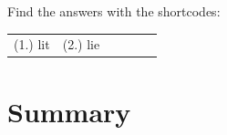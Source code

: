 \label{m39392*eip-770}
\par {} Find the answers with the shortcodes:
\par \begin{tabular}[h]{cccccc}
(1.) lit  &  (2.) lie  & \end{tabular}

\section{Summary}


